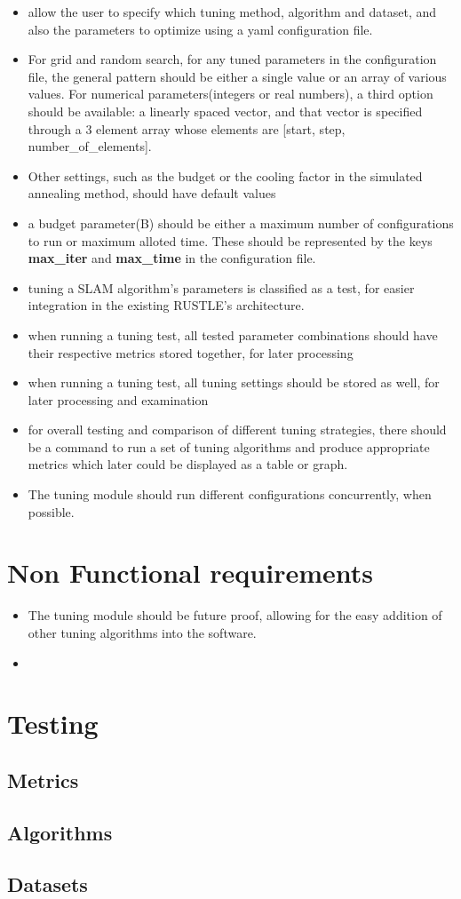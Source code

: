 \begin{itemize}
	\item allow the user to specify which tuning method, algorithm and dataset, and also the parameters to optimize using a yaml configuration file.
	\item For grid and random search, for any tuned parameters in the configuration file, the general pattern should be either a single value or an array of various values. For numerical parameters(integers or real numbers), a third option should be available: a linearly spaced vector, and that vector is specified through a 3 element array whose elements are [start, step, number\_of\_elements].
	\item Other settings, such as the budget or the cooling factor in the simulated annealing method, should have default values
	\item a budget parameter(B) should be either a maximum number of configurations to run or maximum alloted time. These should be represented by the keys \textbf{max\_iter} and \textbf{max\_time} in the configuration file.
	\item tuning a SLAM algorithm's parameters is classified as a test, for easier integration in the existing RUSTLE's architecture.
	\item when running a tuning test, all tested parameter combinations should have their respective metrics stored together, for later processing
	\item when running a tuning test, all tuning settings should be stored as well, for later processing and examination
	\item for overall testing and comparison of different tuning strategies, there should be a command to run a set of tuning algorithms and produce appropriate metrics which later could be displayed as a table or graph.
	\item The tuning module should run different configurations concurrently, when possible.
\end{itemize}

\section{Non Functional requirements}

\begin{itemize}
	\item The tuning module should be future proof, allowing for the easy addition of other tuning algorithms into the software.
	\item 
\end{itemize}

\section{Testing}

\subsection{Metrics}

\subsection{Algorithms}

\subsection{Datasets}